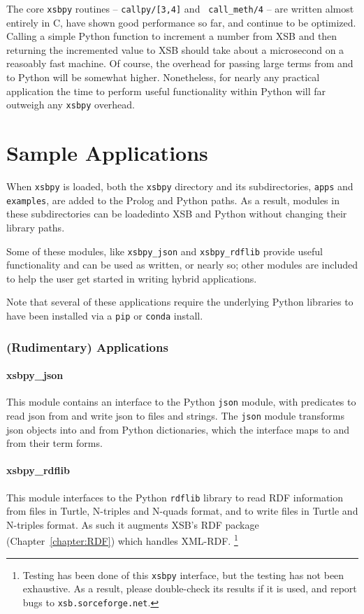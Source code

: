 The core {\tt xsbpy} routines -- {\tt callpy/[3,4]} and {\tt
  call\_meth/4} -- are written almost entirely in C, have shown good
performance so far, and continue to be optimized.  Calling a simple
Python function to increment a number from XSB and then returning the
incremented value to XSB should take about a microsecond on a
reasoably fast machine.  Of course, the overhead for passing large
terms from and to Python will be somewhat higher.  Nonetheless, for
nearly any practical application the time to perform useful
functionality within Python will far outweigh any {\tt xsbpy}
overhead.

\section{Sample Applications}
When {\tt xsbpy} is loaded, both the {\tt xsbpy} directory and its
subdirectories, {\tt apps} and {\tt examples}, are added to the Prolog
and Python paths.  As a result, modules in these subdirectories can be
loadedinto XSB and Python without changing their library paths.

Some of these modules, like {\tt xsbpy\_json} and {\tt xsbpy\_rdflib}
provide useful functionality and can be used as written, or nearly so;
other modules are included to help the user get started in writing
hybrid applications.

Note that several of these applications require the underlying Python
libraries to have been installed via a {\tt pip} or {\tt conda}
install.

\subsubsection{(Rudimentary) Applications}

\paragraph{xsbpy\_json}
This module contains an interface to the Python {\tt json}
module, with predicates to read json from and write json to files and
strings.  The {\tt json} module transforms json objects into and from Python
dictionaries, which the interface maps to and from their term forms.

\paragraph{xsbpy\_rdflib}
This module interfaces to the Python {\tt rdflib} library to read RDF
information from files in Turtle, N-triples and N-quads format, and to
write files in Turtle and N-triples format.  As such it augments XSB's
RDF package (Chapter~\ref{chapter:RDF}) which handles
XML-RDF. \footnote{Testing has been done of this {\tt xsbpy}
  interface, but the testing has not been exhaustive.  As a result,
  please double-check its results if it is used, and report bugs to
  {\tt xsb.sorceforge.net}.}

